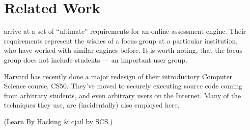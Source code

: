 
\section{Related Work}

\cite{sclater-howie-2003}  arrive at a set of ``ultimate'' requirements for an
online assessment engine. Their requirements represent the wishes of a focus
group at a particular institution, who have worked with similar engines before.
It is worth noting, that the focus group does not include students --- an
important user group.

Harvard has recently done a major redesign of their introductory Computer
Science course, CS50\cite{malan-2010a}. They've moved to securely executing
source code coming from arbitrary students, and even arbitrary users on the
Internet\cite{malan-2010b,malan-2013}. Many of the techniques they use, are
(incidentally) also employed here.

(Learn By Hacking \& cjail by SCS.)
